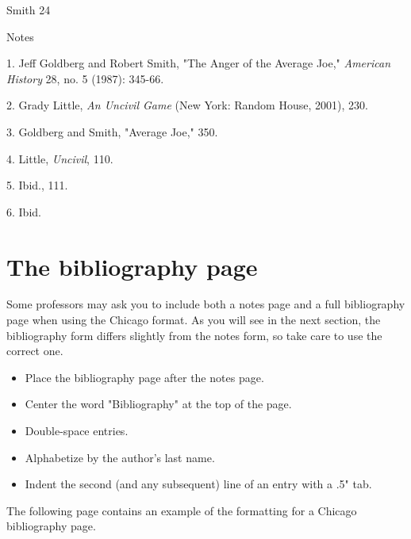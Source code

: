 \thispagestyle{empty}

\thispagestyle{empty}
\begin{flushright}Smith 24\end{flushright}
\begin{center}Notes\end{center}
\begin{Spacing}{2}

 \hspace{.4in} 1. Jeff Goldberg and Robert Smith, "The Anger of the Average Joe," 
\emph{American History} 28, no. 5 (1987): 345-66.

  \hspace{.4in} 2. Grady Little, \emph{An Uncivil Game} (New York: Random House, 2001), 230.

  \hspace{.4in} 3. Goldberg and Smith, "Average Joe," 350.

  \hspace{.4in} 4. Little, \emph{Uncivil}, 110.

 \hspace{.4in}  5. Ibid., 111.

  \hspace{.4in} 6. Ibid.
\end{Spacing}

\newpage


\section{The bibliography page}
Some professors may ask you to include both a notes page and a full bibliography page 
when using the Chicago format. As you will see in the next section, the bibliography 
form differs slightly from the notes form, so take care to use the correct one.

\begin{itemize}
\item Place the bibliography page after the notes page.
\item Center the word "Bibliography" at the top of the page.
\item Double-space entries.
\item Alphabetize by the author's last name.
\item Indent the second (and any subsequent) line of an entry with a .5" tab.
\end{itemize}

The following page contains an example of the formatting for a Chicago bibliography 
page.
\newpage



